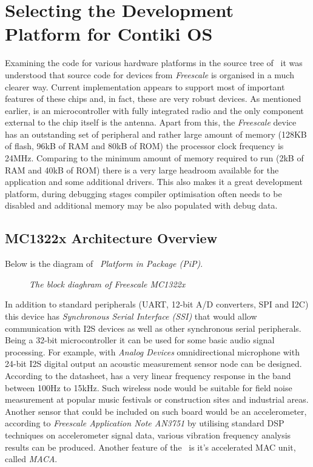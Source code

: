 \section{Selecting the Development Platform for Contiki OS} \label{sec:MCX}

  Examining the code for various hardware platforms in the source
 tree of \ContikiOS\, it was understood that source code for
  devices from \emph{Freescale} is organised in a
 much clearer way. Current implementation appears to support most
 of important features of these chips and, in fact, these are
 very robust devices. As mentioned earlier,  is an
  microcontroller with fully integrated radio and
 the only component external to the chip itself is the antenna.
 Apart from this, the \emph{Freescale} device has an outstanding
 set of peripheral and rather large amount of memory (128KB of
 flash, 96kB of RAM and 80kB of ROM) the processor clock frequency
 is 24MHz. Comparing to the minimum amount of memory required
 to run \Contiki (2kB of RAM and 40kB of ROM) there is a very
 large headroom available for the application and some additional
 drivers. This also makes it a great development platform, during
 debugging stages compiler optimisation often needs to be disabled
 and additional memory may be also populated with debug data.

\subsection{MC1322x Architecture Overview}

 Below is the diagram of \MCX\ \emph{Platform in Package (PiP)}.

\begin{figure}
\caption{\emph{The block diaghram of Freescale MC1322x}}
\end{figure}

  In addition to standard peripherals (UART, 12-bit A/D converters,
 SPI and I2C) this device has \emph{Synchronous Serial Interface (SSI)}
 that would allow communication with I2S devices as well as other
 synchronous serial peripherals. Being a 32-bit microcontroller
 it can be used for some basic audio signal processing. For example,
 with \emph{Analog Devices}  omnidirectional microphone
 with 24-bit I2S digital output \cite{datasheet:adi:admp441} an
 acoustic measurement sensor node can be designed. According to the
 datasheet,  has a very linear frequency response in
 the band between 100Hz to 15kHz. Such wireless node would be
 suitable for field noise measurement at popular music festivals
 or construction sites and industrial areas.
 Another sensor that could be included on such board would be an
 accelerometer, according to \emph{Freescale Application
 Note AN3751} \cite{appnote:freescale:AN3751} by utilising standard
 DSP techniques on accelerometer signal data, various vibration
 frequency analysis results can be produced. Another feature of
 the \MCX\ is it's accelerated MAC unit, called \emph{MACA}.

